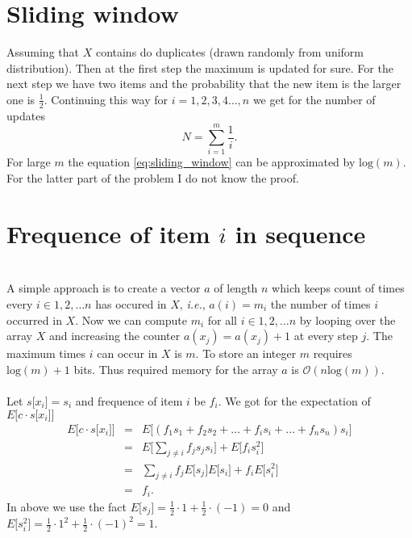 \documentclass[article,11pt]{article}
\begin{document}
\section{Sliding window}
Assuming that $X$ contains do duplicates (drawn randomly from uniform distribution). Then at the first step the maximum is updated for sure.
For the next step we have two items and the probability that the new item is the larger one is $\frac{1}{2}$. Continuing this way
for $i=1,2,3,4\ldots ,n$ we get for the number of updates
\begin{equation}
  N = \sum_{i=1}^m\frac{1}{i}.
  \label{eq:sliding_window}
\end{equation}
For large $m$ the equation \ref{eq:sliding_window} can be approximated by $\mathrm{log}(m)$. For the latter part of the problem I do not know
the proof.


\section{Frequence of item $i$ in sequence}
\\
A simple approach is to create a vector $a$ of length $n$ which keeps count of times every $i \in 1,2,\ldots n$ has occured in $X$,
\textit{i.e.}, $a(i)=m_i$ the number of times $i$ occurred in $X$. Now we can compute $m_i$ for all $i \in 1,2,\ldots n$ by looping over the array
$X$ and increasing the counter $a(x_j) = a(x_j) + 1$ at every step $j$. 
The maximum times $i$ can occur in $X$ is $m$. To store an integer $m$ requires $\mathrm{log}(m)+1$ bits. Thus required memory for the
array $a$ is $\mathcal{O}(n\mathrm{log}(m))$.\\

\\
Let $s\lbrack x_i\rbrack = s_i$ and frequence of item $i$ be $f_i$. We got for the expectation of
$E\lbrack c\cdot s\lbrack x_i\rbrack\rbrack$
\begin{eqnarray}
  E\lbrack c\cdot s\lbrack x_i\rbrack\rbrack&=& E\lbrack (f_1s_1+f_2s_2+\ldots+f_is_i+\ldots+f_ns_n)s_i\rbrack\nonumber\\
  &=&E\lbrack\sum_{j\neq i}f_js_js_i\rbrack + E\lbrack f_is_i^2\rbrack\nonumber\\
  &=&\sum_{j\neq i}f_jE\lbrack s_j\rbrack E\lbrack s_i\rbrack + f_iE\lbrack s_i^2\rbrack\nonumber\\
  &=&f_i.
\end{eqnarray}
In above we use the fact $E\lbrack s_j\rbrack = \frac{1}{2}\cdot 1 +\frac{1}{2}\cdot (-1) = 0$ and  $E\lbrack s_i^2\rbrack = \frac{1}{2}\cdot 1^2 +\frac{1}{2}\cdot (-1)^2 = 1$. 
\end{document}
